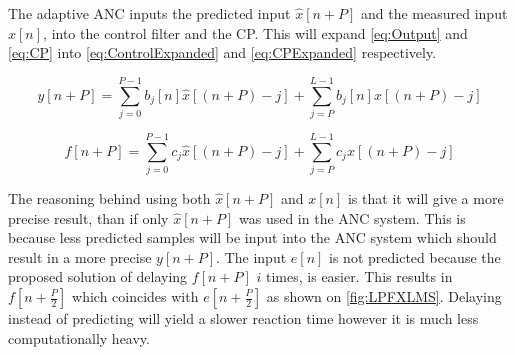 The adaptive ANC inputs the predicted input $\hat{x}[n+P]$ and the measured input $x[n]$, into the control filter and the CP. This will expand \autoref{eq:Output} and \autoref{eq:CP} into \autoref{eq:ControlExpanded} and \autoref{eq:CPExpanded} respectively.   

\begin{equation}\label{eq:ControlExpanded}
y[n+P]=\sum^{P-1}_{j=0}b_j[n]\hat{x}[(n+P)-j]+\sum^{L-1}_{j=P}b_j[n]x[(n+P)-j]
\end{equation}

\begin{equation}\label{eq:CPExpanded}
f[n+P]=\sum^{P-1}_{j=0}c_j\hat{x}[(n+P)-j]+\sum^{L-1}_{j=P}c_jx[(n+P)-j]
\end{equation}

The reasoning behind using both $\hat{x}[n+P]$ and $x[n]$ is that it will give a more precise result, than if only $\hat{x}[n+P]$ was used in the ANC system. This is because less predicted samples will be input into the ANC system which should result in a more precise $y[n+P]$. The input $e[n]$ is not predicted because the proposed solution of delaying $f[n+P]$ $i$ times, is easier. This results in $f[n+\frac{P}{2}]$ which coincides with $e[n+\frac{P}{2}]$ as shown on \autoref{fig:LPFXLMS}. Delaying instead of predicting will yield a slower reaction time however it is much less computationally heavy.       

